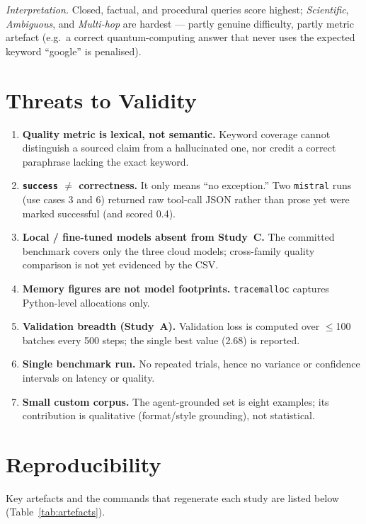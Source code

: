 \documentclass[11pt,a4paper]{article}
\begin{document}
\noindent\textit{Interpretation.} Closed, factual, and procedural queries score
highest; \emph{Scientific}, \emph{Ambiguous}, and \emph{Multi-hop} are hardest
--- partly genuine difficulty, partly metric artefact (e.g.\ a correct
quantum-computing answer that never uses the expected keyword ``google'' is
penalised).

\section{Threats to Validity}
\begin{enumerate}\itemsep2pt
  \item \textbf{Quality metric is lexical, not semantic.} Keyword coverage
        cannot distinguish a sourced claim from a hallucinated one, nor credit a
        correct paraphrase lacking the exact keyword.
  \item \textbf{\texttt{success} $\neq$ correctness.} It only means ``no
        exception.'' Two \texttt{mistral} runs (use cases 3 and 6) returned raw
        tool-call JSON rather than prose yet were marked successful (and scored
        0.4).
  \item \textbf{Local / fine-tuned models absent from Study~C.} The committed
        benchmark covers only the three cloud models; cross-family quality
        comparison is not yet evidenced by the CSV.
  \item \textbf{Memory figures are not model footprints.} \texttt{tracemalloc}
        captures Python-level allocations only.
  \item \textbf{Validation breadth (Study~A).} Validation loss is computed over
        $\leq$100 batches every 500 steps; the single best value (2.68) is
        reported.
  \item \textbf{Single benchmark run.} No repeated trials, hence no variance or
        confidence intervals on latency or quality.
  \item \textbf{Small custom corpus.} The agent-grounded set is eight examples;
        its contribution is qualitative (format/style grounding), not
        statistical.
\end{enumerate}

\section{Reproducibility}
Key artefacts and the commands that regenerate each study are listed below
(Table~\ref{tab:artefacts}).
\end{document}
